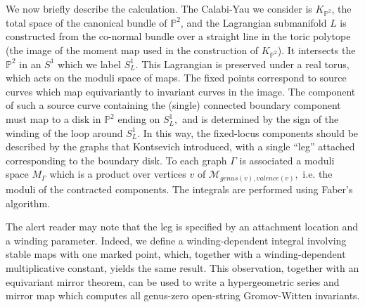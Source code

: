 \documentclass[a4paper,11pt]{article}
\newcommand{\PP}{{\mathbb{P}}}
\begin{document}

We now briefly describe the calculation.  The
Calabi-Yau we consider is $K_{\PP^2}$, the
total space of the canonical bundle of $\PP^2$,
and the Lagrangian submanifold $L$ is constructed from the
co-normal bundle over a straight line in the toric
polytope (the image of the
moment map used in the construction of $K_{\PP^2}$).  It intersects
the $\PP^2$ in an $S^1$ which we label $S^1_L$.
This Lagrangian is preserved under a real torus, which
acts on the moduli space of maps.
The fixed points correspond to
source curves which
map equivariantly to invariant curves in the image.
The component of such
a source curve containing the
(single) connected boundary component must map to
a disk in $\PP^2$ ending on $S^1_L,$ and is determined by the
sign of the winding of the loop around $S^1_L.$ 
In this way, the fixed-locus components should be described by
the graphs that Kontsevich introduced, with a single ``leg''
attached corresponding to the boundary disk.
To each graph $\Gamma$
is associated a moduli space $M_\Gamma$
which is a product over vertices $v$ of
${\mathcal M}_{genus(v),valence(v)},$
i.e. the moduli of the contracted components.
The integrals are performed using Faber's algorithm.

The alert reader may note that the leg is specified
by an attachment location and a winding parameter.
Indeed, we define a winding-dependent integral involving
stable maps with one marked point, which, together
with a winding-dependent multiplicative constant,
yields the same result.  This observation, together
with an equivariant mirror theorem, can be
used to write a hypergeometric series and mirror map
which computes all genus-zero open-string Gromov-Witten
invariants.
\end{document}
